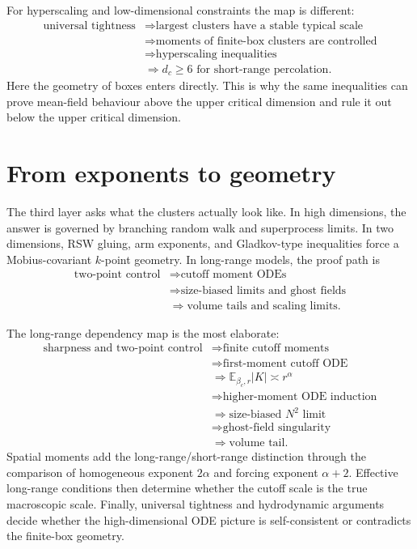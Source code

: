 \documentclass[11pt,reqno]{book}
\numberwithin{equation}{chapter}
\theoremstyle{plain}
\theoremstyle{definition}
\theoremstyle{remark}
\newcommand{\E}{\mathbb E}
\newcommand{\1}{\mathbf 1}
\begin{document}
For hyperscaling and low-dimensional constraints the map is different:
\[
\begin{aligned}
\text{universal tightness}
&\Longrightarrow \text{largest clusters have a stable typical scale}\\
&\Longrightarrow \text{moments of finite-box clusters are controlled}\\
&\Longrightarrow \text{hyperscaling inequalities}\\
&\Longrightarrow d_c\geq6\text{ for short-range percolation}.
\end{aligned}
\]
Here the geometry of boxes enters directly. This is why the same inequalities can prove mean-field behaviour above the upper critical dimension and rule it out below the upper critical dimension.

\section{From exponents to geometry}

The third layer asks what the clusters actually look like. In high dimensions, the answer is governed by branching random walk and superprocess limits. In two dimensions, RSW gluing, arm exponents, and Gladkov-type inequalities force a Mobius-covariant $k$-point geometry. In long-range models, the proof path is
\[
\begin{aligned}
\text{two-point control}
&\Longrightarrow \text{cutoff moment ODEs}\\
&\Longrightarrow \text{size-biased limits and ghost fields}\\
&\Longrightarrow \text{volume tails and scaling limits}.
\end{aligned}
\]

The long-range dependency map is the most elaborate:
\[
\begin{aligned}
\text{sharpness and two-point control}
&\Longrightarrow \text{finite cutoff moments}\\
&\Longrightarrow \text{first-moment cutoff ODE}\\
&\Longrightarrow \E_{\beta_c,r}|K|\asymp r^\alpha\\
&\Longrightarrow \text{higher-moment ODE induction}\\
&\Longrightarrow \text{size-biased }N^2\text{ limit}\\
&\Longrightarrow \text{ghost-field singularity}\\
&\Longrightarrow \text{volume tail}.
\end{aligned}
\]
Spatial moments add the long-range/short-range distinction through the comparison of homogeneous exponent $2\alpha$ and forcing exponent $\alpha+2$. Effective long-range conditions then determine whether the cutoff scale is the true macroscopic scale. Finally, universal tightness and hydrodynamic arguments decide whether the high-dimensional ODE picture is self-consistent or contradicts the finite-box geometry.
\end{document}
